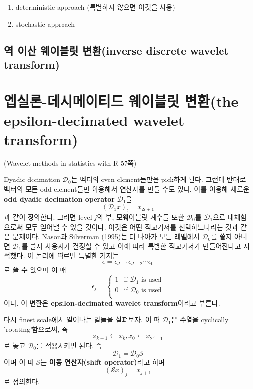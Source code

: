 \documentclass[b5paper,]{scrbook}
\theoremstyle{plain}
\theoremstyle{definition}
\numberwithin{equation}{section}
\begin{document}
\begin{enumerate}
\def\labelenumi{\arabic{enumi}.}
\item
  deterministic approach (특별하지 않으면 이것을 사용)
\item
  stochastic approach
\end{enumerate}

\subsection{역 이산 웨이블릿 변환(inverse discrete wavelet
transform)}\label{---inverse-discrete-wavelet-transform}

\section{엡실론-데시메이티드 웨이블릿 변환(the epsilon-decimated wavelet
transform)}\label{---the-epsilon-decimated-wavelet-transform}

(Wavelet methods in statistics with R 57쪽)

Dyadic decimation \(\mathcal{D}_{0}\)는 벡터의 even element들만을
pick하게 된다. 그런데 반대로 벡터의 모든 odd element들만 이용해서
연산자를 만들 수도 있다. 이를 이용해 새로운 \textbf{odd dyadic
decimation operator} \(\mathcal{D}_{1}\)을
\[(\mathcal{D}_{1}x)_{l}=x_{2l+1}\] 과 같이 정의한다. 그러면 level
\(j\)의 부, 모웨이블릿 계수들 또한 \(\mathcal{D}_{0}\)를
\(\mathcal{D}_{1}\)으로 대체함으로써 모두 얻어낼 수 있을 것이다. 이것은
어떤 직교기저를 선택하느냐라는 것과 같은 문제이다. Nason과 Silverman
(1995)는 더 나아가 모든 레벨에서 \(\mathcal{D}_{0}\)를 쓸지 아니면
\(\mathcal{D}_{1}\)를 쓸지 사용자가 결정할 수 있고 이에 따라 특별한
직교기저가 만들어진다고 지적했다. 이 논리에 따르면 특별한 기저는
\[\epsilon=\epsilon_{J-1}\epsilon_{J-2}\cdots\epsilon_{0}\] 로 쓸 수
있으며 이 때 \[
\epsilon_{j} = 
\begin{cases}
1 & \text{if $\mathcal{D}_{1}$ is used} \\
0 & \text{if $\mathcal{D}_{0}$ is used}\\
\end{cases}
\] 이다. 이 변환은 \textbf{epsilon-decimated wavelet transform}이라고
부른다.

다시 finest scale에서 일어나는 일들을 살펴보자. 이 때
\(\mathcal{D}_{1}\)은 수열을 cyclically 'rotating'함으로써, 즉
\[x_{k+1} \leftarrow x_{k}, x_{0} \leftarrow x_{2^{J}-1}\] 로 놓고
\(\mathcal{D}_{0}\)를 적용시키면 된다. 즉
\[\mathcal{D}_{1}=\mathcal{D}_{0}\mathcal{S}\] 이며 이 때
\(\mathcal{S}\)는 \textbf{이동 연산자(shift operator)}라고 하며
\[(\mathcal{S}x)_{j}=x_{j+1}\] 로 정의한다.
\end{document}
